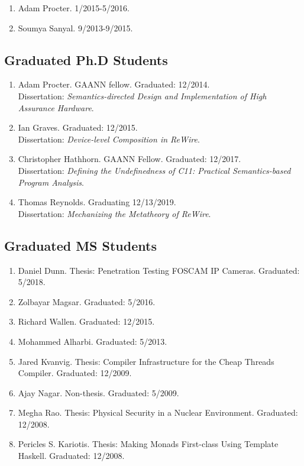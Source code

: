 \documentclass[12pt]{article} %
\begin{document}
\begin{enumerate}[leftmargin=0.0mm]
\item Adam Procter. 1/2015-5/2016.
\item Soumya Sanyal. 9/2013-9/2015.
\end{enumerate}

\subsection*{Graduated Ph.D Students}

\begin{enumerate}[leftmargin=0.0mm]
\item Adam Procter. GAANN fellow. Graduated: 12/2014.\\
\newblock Dissertation: \emph{Semantics-directed Design and Implementation of High Assurance Hardware}.

\item Ian Graves. Graduated: 12/2015.\\
\newblock Dissertation: \emph{Device-level Composition in ReWire}.


\item Christopher Hathhorn. GAANN Fellow. Graduated: 12/2017.\\
\newblock Dissertation: \emph{Defining the Undefinedness of C11: Practical Semantics-based Program Analysis}.

\item Thomas Reynolds. Graduating 12/13/2019. \\
\newblock Dissertation: \emph{Mechanizing the Metatheory of ReWire}.


\end{enumerate}

\subsection*{Graduated MS Students}

\begin{enumerate}[leftmargin=0.0mm]
\item Daniel Dunn. Thesis: Penetration Testing FOSCAM IP Cameras. Graduated: 5/2018.
\item Zolbayar Magsar. Graduated: 5/2016.
\item Richard Wallen. Graduated: 12/2015.
\item Mohammed Alharbi. Graduated: 5/2013.
\item Jared Kvanvig. Thesis: Compiler Infrastructure for the Cheap Threads Compiler. Graduated: 12/2009.
\item Ajay Nagar.  Non-thesis. Graduated: 5/2009.
\item Megha Rao. Thesis: Physical Security in a Nuclear Environment. Graduated: 12/2008.
\item Pericles S. Kariotis. Thesis: Making Monads First-class Using Template Haskell. Graduated: 12/2008.
\end{enumerate}
\end{document}
